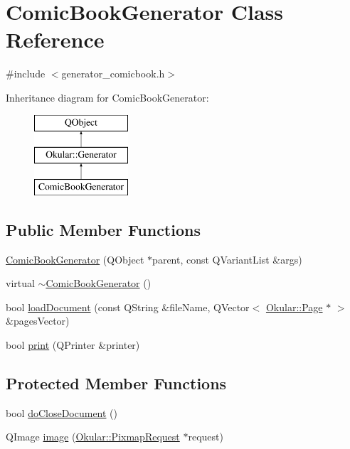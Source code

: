 \hypertarget{classComicBookGenerator}{\section{Comic\+Book\+Generator Class Reference}
\label{classComicBookGenerator}
}


{\ttfamily \#include $<$generator\+\_\+comicbook.\+h$>$}

Inheritance diagram for Comic\+Book\+Generator\+:\begin{figure}[H]
\begin{center}
\leavevmode
\includegraphics[height=3.000000cm]{classComicBookGenerator}
\end{center}
\end{figure}
\subsection*{Public Member Functions}
\begin{DoxyCompactItemize}
\item 
\hyperlink{classComicBookGenerator_a77c37e29b4ee42f74e9a3c0a1c470a41}{Comic\+Book\+Generator} (Q\+Object $\ast$parent, const Q\+Variant\+List \&args)
\item 
virtual \hyperlink{classComicBookGenerator_a5893114c687f5aa497f0860825e7b115}{$\sim$\+Comic\+Book\+Generator} ()
\item 
bool \hyperlink{classComicBookGenerator_a918c1d51b4a4891d412e0ae4f3775df9}{load\+Document} (const Q\+String \&file\+Name, Q\+Vector$<$ \hyperlink{classOkular_1_1Page}{Okular\+::\+Page} $\ast$ $>$ \&pages\+Vector)
\item 
bool \hyperlink{classComicBookGenerator_ab5f1a260dddbeee825d293926a883661}{print} (Q\+Printer \&printer)
\end{DoxyCompactItemize}
\subsection*{Protected Member Functions}
\begin{DoxyCompactItemize}
\item 
bool \hyperlink{classComicBookGenerator_a123f741df86f8e8b2e379e12c3ab31ce}{do\+Close\+Document} ()
\item 
Q\+Image \hyperlink{classComicBookGenerator_a473ac38c97610d3870fa01def287c413}{image} (\hyperlink{classOkular_1_1PixmapRequest}{Okular\+::\+Pixmap\+Request} $\ast$request)
\end{DoxyCompactItemize}
